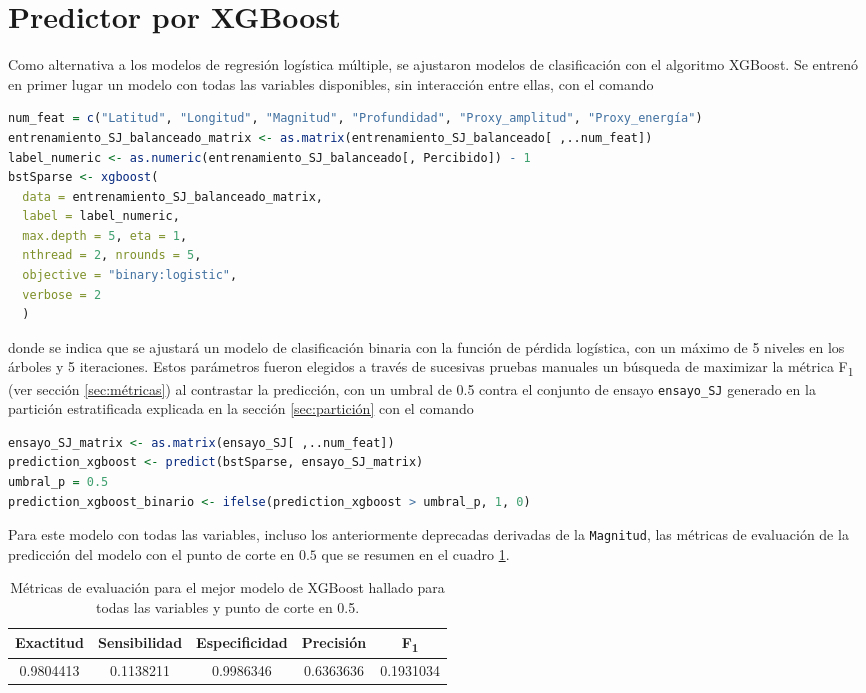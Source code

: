 \documentclass[a4paper]{report}
\begin{document}
\section{Predictor por XGBoost}
Como alternativa a los modelos de regresión logística múltiple, se ajustaron modelos de clasificación con el algoritmo XGBoost.
Se entrenó en primer lugar un modelo con todas las variables disponibles, sin interacción entre ellas, con el comando
\begin{lstlisting}[language=R, breaklines=true]
num_feat = c("Latitud", "Longitud", "Magnitud", "Profundidad", "Proxy_amplitud", "Proxy_energía")
entrenamiento_SJ_balanceado_matrix <- as.matrix(entrenamiento_SJ_balanceado[ ,..num_feat])
label_numeric <- as.numeric(entrenamiento_SJ_balanceado[, Percibido]) - 1
bstSparse <- xgboost(
  data = entrenamiento_SJ_balanceado_matrix, 
  label = label_numeric, 
  max.depth = 5, eta = 1, 
  nthread = 2, nrounds = 5, 
  objective = "binary:logistic", 
  verbose = 2
  )
\end{lstlisting}
donde se indica que se ajustará un modelo de clasificación binaria con la función de pérdida logística, con un máximo de 5 niveles en los árboles y 5 iteraciones.
Estos parámetros fueron elegidos a través de sucesivas pruebas manuales un búsqueda de maximizar la métrica F\textsubscript{1} (ver sección \ref{sec:métricas}) al contrastar la predicción, con un umbral de \num{0.5} contra el conjunto de ensayo \verb'ensayo_SJ' generado en la partición estratificada explicada en la sección \ref{sec:partición} con el comando
\begin{lstlisting}[language=R, breaklines=true]
ensayo_SJ_matrix <- as.matrix(ensayo_SJ[ ,..num_feat])
prediction_xgboost <- predict(bstSparse, ensayo_SJ_matrix)
umbral_p = 0.5
prediction_xgboost_binario <- ifelse(prediction_xgboost > umbral_p, 1, 0)
\end{lstlisting}
Para este modelo con todas las variables, incluso los anteriormente deprecadas derivadas de la \verb'Magnitud', las métricas de evaluación de la predicción del modelo con el punto de corte en \(0.5\) que se resumen en el cuadro \ref{tab:xgboost_metrics}.
\begin{table}[!ht]
	\centering
	\begin{tabular}{ccccc}
	\toprule
	Exactitud & Sensibilidad & Especificidad & Precisión & F\textsubscript{1} \\
	\midrule
	\num{0.9804413} & \num{0.1138211} & \num{0.9986346} & \num{0.6363636} & \num{0.1931034} \\
	\bottomrule
	\end{tabular}
	\caption{Métricas de evaluación para el mejor modelo de XGBoost hallado para todas las variables y punto de corte en \num{0.5}.}
	\label{tab:xgboost_metrics}
\end{table}
\end{document}
